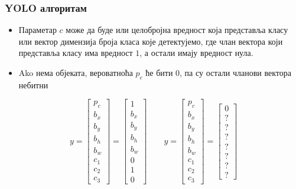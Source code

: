 \begin{frame}
\frametitle{YOLO алгоритам}
\begin{itemize}
  \item Параметар \alert{$c$} може да буде или \alert{целобројна}
  вредност која представља класу \alert{или
  вектор} димензија броја класа које детектујемо, где члан вектора који
  представља класу има вредност $1$, а остали имају вредност нула.
  \item Ako нема објеката, вероватноћа $p_c$ ће бити
  0, па су остали чланови вектора небитни
\end{itemize}
 \begin{equation}
  y =
  \begin{bmatrix}
  p_c \\
  b_x \\
  b_y \\
  b_h \\
  b_w \\
  c_1 \\
  c_2 \\
  c_3
  \end{bmatrix}
  =
  \begin{bmatrix}
  1 \\
  b_x \\
  b_y \\
  b_h \\
  b_w \\
  0 \\
  1 \\
  0
  \end{bmatrix} \qquad
  y =
  \begin{bmatrix}
  p_c \\
  b_x \\
  b_y \\
  b_h \\
  b_w \\
  c_1 \\
  c_2 \\
  c_3
  \end{bmatrix}
  =
  \begin{bmatrix}
  0 \\
  ? \\
  ? \\
  ? \\
  ? \\
  ? \\
  ? \\
  ?
  \end{bmatrix}
  \end{equation}
\end{frame}

